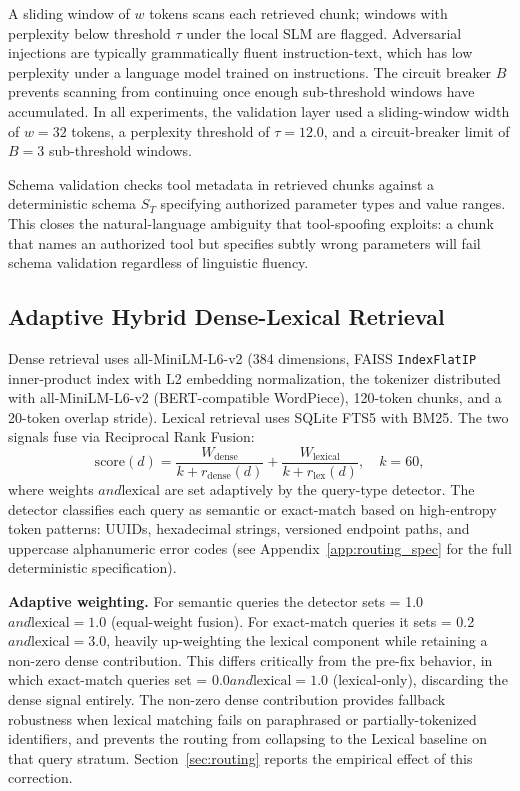\documentclass[sigconf,authordraft]{acmart}
\begin{document}
A sliding window of $w$ tokens scans each retrieved chunk; windows with
perplexity below threshold $\tau$ under the local SLM are flagged.
Adversarial injections are typically grammatically fluent instruction-text,
which has low perplexity under a language model trained on instructions.
The circuit breaker $B$ prevents scanning from continuing once enough
sub-threshold windows have accumulated. In all experiments, the validation layer used a sliding-window width of $w = 32$ tokens, a perplexity threshold of $\tau = 12.0$, and a circuit-breaker limit of $B = 3$ sub-threshold windows.

Schema validation checks tool metadata in retrieved chunks against a
deterministic schema $S_T$ specifying authorized parameter types and
value ranges. This closes the natural-language ambiguity that
tool-spoofing exploits: a chunk that names an authorized tool but
specifies subtly wrong parameters will fail schema validation regardless
of linguistic fluency.

\subsection{Adaptive Hybrid Dense-Lexical Retrieval}
\label{sec:retrieval_arch}

Dense retrieval uses all-MiniLM-L6-v2 (384 dimensions, FAISS
\texttt{IndexFlatIP} inner-product index with L2 embedding normalization,
the tokenizer distributed with all-MiniLM-L6-v2 (BERT-compatible WordPiece), 120-token chunks, and a 20-token overlap stride).
Lexical retrieval uses SQLite
FTS5 with BM25. The two signals fuse via Reciprocal Rank Fusion:
\begin{equation}
  \mathrm{score}(d) =
    \frac{W_{\mathrm{dense}}}{k+r_{\mathrm{dense}}(d)}+
    \frac{W_{\mathrm{lexical}}}{k+r_{\mathrm{lex}}(d)},
    \quad k=60,
\end{equation}
where weights {}$ and {\mathrm{lexical}}$ are set adaptively by the query-type detector.
The detector classifies each query as semantic or exact-match based on
high-entropy token patterns: UUIDs, hexadecimal strings, versioned
endpoint paths, and uppercase alphanumeric error codes (see
Appendix~\ref{app:routing_spec} for the full deterministic specification).

\textbf{Adaptive weighting.} For semantic queries the detector sets
{} = 1.0$ and {\mathrm{lexical}} = 1.0$ (equal-weight fusion). For exact-match queries it sets
{} = 0.2$ and {\mathrm{lexical}} = 3.0$, heavily up-weighting the lexical component while retaining a
non-zero dense contribution. This differs critically from the pre-fix
behavior, in which exact-match queries set {} = 0.0$ and {\mathrm{lexical}} = 1.0$ (lexical-only),
discarding the dense signal entirely. The non-zero dense contribution
provides fallback robustness when lexical matching fails on paraphrased or
partially-tokenized identifiers, and prevents the routing from collapsing
to the Lexical baseline on that query stratum. Section~\ref{sec:routing}
reports the empirical effect of this correction.
\end{document}
